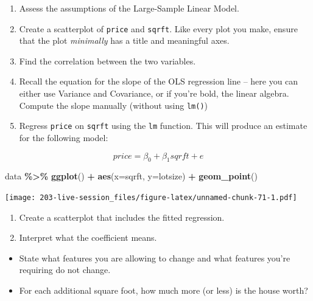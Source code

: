 \documentclass[
]{book}
\newenvironment{Shaded}{\begin{snugshade}}{\end{snugshade}}
\newcommand{\AttributeTok}[1]{\textcolor[rgb]{0.13,0.29,0.53}{#1}}
\newcommand{\FunctionTok}[1]{\textcolor[rgb]{0.13,0.29,0.53}{\textbf{#1}}}
\newcommand{\NormalTok}[1]{#1}
\newcommand{\SpecialCharTok}[1]{\textcolor[rgb]{0.81,0.36,0.00}{\textbf{#1}}}
\providecommand{\tightlist}{%
  \setlength{\itemsep}{0pt}\setlength{\parskip}{0pt}}
\theoremstyle{definition}
\theoremstyle{definition}
\theoremstyle{definition}
\theoremstyle{definition}
\theoremstyle{remark}
\begin{document}
\begin{enumerate}
\def\labelenumi{\arabic{enumi}.}
\setcounter{enumi}{-1}
\item
  Assess the assumptions of the Large-Sample Linear Model.
\item
  Create a scatterplot of \texttt{price} and \texttt{sqrft}. Like every plot you make, ensure that the plot \emph{minimally} has a title and meaningful axes.
\item
  Find the correlation between the two variables.
\item
  Recall the equation for the slope of the OLS regression line -- here you can either use Variance and Covariance, or if you're bold, the linear algebra. Compute the slope manually (without using \texttt{lm()})
\item
  Regress \texttt{price} on \texttt{sqrft} using the \texttt{lm} function. This will produce an estimate for the following model:
\end{enumerate}

\[ 
  price = \beta_{0} + \beta_{1} sqrft + e
\]

\begin{Shaded}
\begin{Highlighting}[]
\NormalTok{data }\SpecialCharTok{\%\textgreater{}\%} 
  \FunctionTok{ggplot}\NormalTok{() }\SpecialCharTok{+} 
  \FunctionTok{aes}\NormalTok{(}\AttributeTok{x=}\NormalTok{sqrft, }\AttributeTok{y=}\NormalTok{lotsize) }\SpecialCharTok{+} 
  \FunctionTok{geom\_point}\NormalTok{()}
\end{Highlighting}
\end{Shaded}

\texttt{[image: 203-live-session\_files/figure-latex/unnamed-chunk-71-1.pdf]}

\begin{enumerate}
\def\labelenumi{\arabic{enumi}.}
\setcounter{enumi}{4}
\item
  Create a scatterplot that includes the fitted regression.
\item
  Interpret what the coefficient means.
\end{enumerate}

\begin{itemize}
\tightlist
\item
  State what features you are allowing to change and what features you're requiring do not change.
\item
  For each additional square foot, how much more (or less) is the house worth?
\end{itemize}
\end{document}

